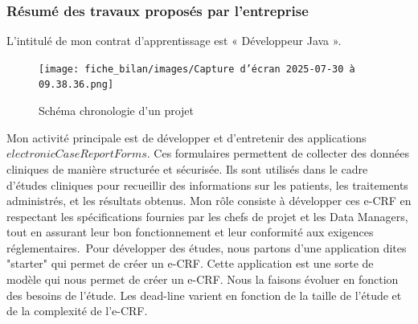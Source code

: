 \subsubsection{Résumé des travaux proposés par l'entreprise}
L'intitulé de mon contrat d'apprentissage est « Développeur Java ».
\begin{figure}[H]
    \centering
    \texttt{[image: fiche\_bilan/images/Capture d’écran 2025-07-30 à 09.38.36.png]} 
    \caption{Schéma chronologie d'un projet}
\end{figure}
Mon activité principale est de développer et d’entretenir des applications
\(electronic Case Report Forms\). Ces formulaires permettent de collecter des données cliniques de manière structurée et sécurisée. Ils sont utilisés dans le cadre d'études cliniques pour recueillir des informations sur les patients, les traitements administrés, et les résultats obtenus. Mon rôle consiste à développer ces e-CRF en respectant les spécifications fournies par les chefs de projet et les Data Managers, tout en assurant leur bon fonctionnement et leur conformité aux exigences réglementaires.\
Pour développer des études, nous partons d'une application dites "starter" qui
permet de créer un e-CRF. Cette application est une sorte de modèle qui nous
permet de créer un e-CRF. Nous la faisons évoluer en fonction des
besoins de l'étude. Les dead-line varient en fonction de la taille de l'étude et de la
complexité de l'e-CRF. 
